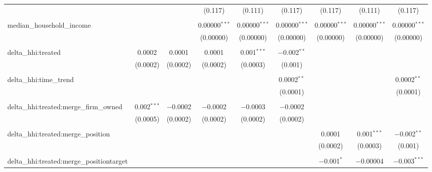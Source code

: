 \begin{table}[H]
{\begin{tabular}{@{\extracolsep{5pt}}lcccccccc}
   &  &  & (0.117) & (0.111) & (0.117) & (0.117) & (0.111) & (0.117) \\  

   & & & & & & & & \\  

  median\_household\_income &  &  & 0.00000$^{***}$ & 0.00000$^{***}$ & 0.00000$^{***}$ & 0.00000$^{***}$ & 0.00000$^{***}$ & 0.00000$^{***}$ \\  

   &  &  & (0.00000) & (0.00000) & (0.00000) & (0.00000) & (0.00000) & (0.00000) \\  

   & & & & & & & & \\  

  delta\_hhi:treated & 0.0002 & 0.0001 & 0.0001 & 0.001$^{***}$ & $-$0.002$^{**}$ &  &  &  \\  

   & (0.0002) & (0.0002) & (0.0002) & (0.0003) & (0.001) &  &  &  \\  

   & & & & & & & & \\  

  delta\_hhi:time\_trend &  &  &  &  & 0.0002$^{**}$ &  &  & 0.0002$^{**}$ \\  

   &  &  &  &  & (0.0001) &  &  & (0.0001) \\  

   & & & & & & & & \\  

  delta\_hhi:treated:merge\_firm\_owned & 0.002$^{***}$ & $-$0.0002 & $-$0.0002 & $-$0.0003 & $-$0.0002 &  &  &  \\  

   & (0.0005) & (0.0002) & (0.0002) & (0.0002) & (0.0002) &  &  &  \\  

   & & & & & & & & \\  

  delta\_hhi:treated:merge\_position &  &  &  &  &  & 0.0001 & 0.001$^{***}$ & $-$0.002$^{**}$ \\  

   &  &  &  &  &  & (0.0002) & (0.0003) & (0.001) \\  

   & & & & & & & & \\  

  delta\_hhi:treated:merge\_positiontarget &  &  &  &  &  & $-$0.001$^{*}$ & $-$0.00004 & $-$0.003$^{***}$ \\  


\end{tabular}}
\end{table}
